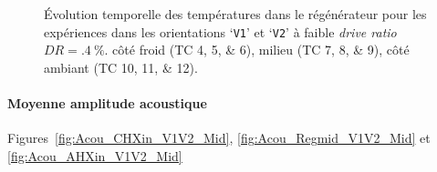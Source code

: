 \begin{figure}[!ht]
    \centering
	\begin{subfigure}{\textwidth}
		\centering
    	
		\caption{}
		\label{fig:Acou_CHXin_V1V2_Low}
	\end{subfigure}		
	\begin{subfigure}{\textwidth}
		\centering
    	
		\caption{}
		\label{fig:Acou_Regmid_V1V2_Low}
	\end{subfigure}		
	\begin{subfigure}{\textwidth}
		\centering
    	
		\caption{}
		\label{fig:Acou_AHXin_V1V2_Low}
	\end{subfigure}		
    \caption{\'Evolution temporelle des températures dans le régénérateur pour les expériences dans les orientations `\texttt{V1}' et `\texttt{V2}' à faible \textit{drive ratio} $DR=\qty{.4}{\percent}$.  côté froid (TC \numlist{4;5;6}),  milieu (TC \numlist{7;8;9}),  côté ambiant (TC \numlist{10;11;12}).}
    \label{fig:Acou_V1V2_Low}
\end{figure}

\paragraph*{Moyenne amplitude acoustique} Figures~\ref{fig:Acou_CHXin_V1V2_Mid}, \ref{fig:Acou_Regmid_V1V2_Mid} et \ref{fig:Acou_AHXin_V1V2_Mid}
%    

%    

